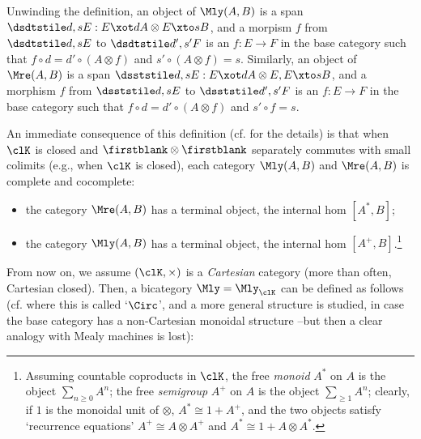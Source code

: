 \begin{remark}\label{moore_2cells}
  Unwinding the definition, an object of $\Mly(A,B)$ is a span $\inMe Eds : E \xot d A\otimes E \xto s B$,
  and a morpism $f$ from $\inMe Eds$ to $\inMe F{d'}{s'}$ is an $f : E\to F$ in the base category such that $f\circ d = d'\circ (A\otimes f)$ and $s'\circ (A\otimes f) = s$.
  Similarly, an object of $\Mre(A,B)$ is a span $\inMo Eds : E \xot d A\otimes E, E \xto s B$,
  and a morphism  $f$ from $\inMo Eds$ to $\inMo F{d'}{s'}$ is an $f : E\to F$ in the base category such that $f\circ d = d'\circ (A\otimes f)$ and $s'\circ f = s$.
\end{remark}
\begin{corollary}
  An immediate consequence of this definition (cf. \cite{noi:completeness} for the details) is that when $\clK$ is closed and $\firstblank\otimes\firstblank$ separately commutes with small colimits (e.g., when $\clK$ is closed), each category $\Mly(A,B)$ and $\Mre(A,B)$ is complete and cocomplete:
  \begin{itemize}
    \item the category $\Mre(A,B)$ has a terminal object, the internal hom $[A^*,B]$;
    \item the category $\Mly(A,B)$ has a terminal object, the internal hom $[A^+,B]$.\footnote{Assuming countable coproducts in $\clK$, the free \emph{monoid} $A^*$ on $A$ is the object $\sum_{n\ge 0} A^n$; the free \emph{semigroup} $A^+$ on $A$ is the object $\sum_{\ge 1} A^n$; clearly, if $1$ is the monoidal unit of $\otimes$, $A^*\cong 1+A^+$, and the two objects satisfy `recurrence equations' $A^+\cong A\otimes A^+$ and $A^*\cong 1+A\otimes A^*$.}
  \end{itemize}
\end{corollary}
From now on, we assume $(\clK,\times)$ is a \emph{Cartesian} category (more than often, Cartesian closed). Then, a bicategory $\Mly=\Mly_\clK$ can be defined as follows (cf. \cite{rosebrugh_sabadini_walters_1998} where this is called `$\Circ$', and a more general structure is studied, in case the base category has a non\hyp{}Cartesian monoidal structure --but then a clear analogy with Mealy machines is lost):
